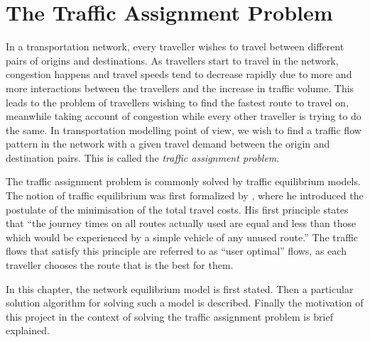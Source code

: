 \chapter{The Traffic Assignment Problem} \label{chap:ta}

In a transportation network,
every traveller wishes to travel between different pairs of origins and destinations.
As travellers start to travel in the network,
congestion happens and travel speeds tend to decrease rapidly due to more and more interactions between the travellers and the increase in traffic volume.
This leads to the problem of travellers wishing to find the fastest route to travel on,
meanwhile taking account of congestion while every other traveller is trying to do the same.
In transportation modelling point of view,
we wish to find a traffic flow pattern in the network with a given travel demand between the origin and destination pairs. 
This is called the \emph{traffic assignment problem}.

The traffic assignment problem is commonly solved by traffic equilibrium models.
The notion of traffic equilibrium was first formalized by \cite{Wardrop},
where he introduced the postulate of the minimisation of the total travel costs.
His first principle states that ``the journey times on all routes actually used are equal and less than those which would be experienced by a simple vehicle of any unused route.''
The traffic flows that satisfy this principle are referred to as ``user optimal'' flows,
as each traveller chooses the route that is the best for them.

In this chapter,
the network equilibrium model is first stated.
Then a particular solution algorithm for solving such a model is described.
Finally the motivation of this project in the context of solving the traffic assignment problem is brief explained.

